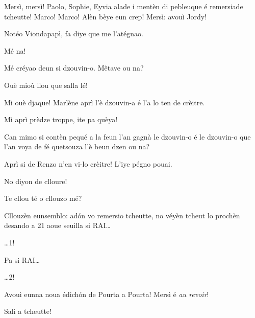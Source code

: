 \begin{drama}


\Jordyspeaks Mersì, mersì! Paolo, Sophie, Eyvia alade i mentèn di pebleuque é remersiade tcheutte! Marco! Marco! Alèn bèye eun crep!  Mersì: avouì Jordy!

\ridocliou



\Brunospeaks Notéo Viondapapì, fa diye que me l'atégnao.

\Noteospeaks Mé na!

\Brunospeaks Mé créyao deun si dzouvin-o. M\^etave ou na?

\Noteospeaks Ouè mioù llou que salla lé!

\Brunospeaks Mi ouè djaque! Marlène aprì l'è dzouvin-a é l'a lo ten de crèitre.

\Noteospeaks Mi aprì prèdze troppe, ite pa quèya!

\Brunospeaks Can mimo si contèn pequé a la feun l'an gagnà le dzou\-vin-o é le dzouvin-o que l'an voya de fé quetsouza l'è beun dzen ou na?

\Noteospeaks  Aprì si de Renzo n'en vi-lo crèitre!  L'iye pégno pouai.

\Brunospeaks No diyon de clloure!

\Noteospeaks  Te cllou té o cllouzo mé?

\Brunospeaks  Cllouzèn eunsemblo: ad\'on  vo remersio tcheutte, no véyèn tcheut lo prochèn desando a 21 aoue seuilla si RAI\ldots

\Noteospeaks \ldots 1!

\Brunospeaks  Pa si RAI\ldots
 
\Noteospeaks \ldots 2!
 
\Brunospeaks Avouì eunna noua édich\'on de Pourta a Pourta! Mersì é \textit{au revoir}!
 
\Noteospeaks Salì a tcheutte!
 


\end{drama}
